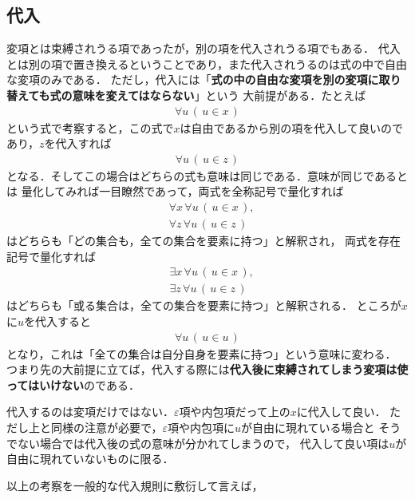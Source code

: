 \subsection{代入}
	変項とは束縛されうる項であったが，別の項を代入されうる項でもある．
	代入とは別の項で置き換えるということであり，また代入されうるのは式の中で自由な変項のみである．
	ただし，代入には「{\bf 式の中の自由な変項を別の変項に取り替えても式の意味を変えてはならない}」という
	大前提がある．たとえば
	\begin{align}
		\forall u\, (\, u \in x\, )
	\end{align}
	という式で考察すると，この式で$x$は自由であるから別の項を代入して良いのであり，$z$を代入すれば
	\begin{align}
		\forall u\, (\, u \in z\, )
	\end{align}
	となる．そしてこの場合はどちらの式も意味は同じである．意味が同じであるとは
	量化してみれば一目瞭然であって，両式を全称記号で量化すれば
	\begin{align}
		&\forall x\, \forall u\, (\, u \in x\, ), \\
		&\forall z\, \forall u\, (\, u \in z\, )
	\end{align}
	はどちらも「どの集合も，全ての集合を要素に持つ」と解釈され，
	両式を存在記号で量化すれば
	\begin{align}
		&\exists x\, \forall u\, (\, u \in x\, ), \\
		&\exists z\, \forall u\, (\, u \in z\, )
	\end{align}
	はどちらも「或る集合は，全ての集合を要素に持つ」と解釈される．
	ところが$x$に$u$を代入すると
	\begin{align}
		\forall u\, (\, u \in u\, )
	\end{align}
	となり，これは「全ての集合は自分自身を要素に持つ」という意味に変わる．
	つまり先の大前提に立てば，代入する際には{\bf 代入後に束縛されてしまう変項は使ってはいけない}のである．
	
	代入するのは変項だけではない．$\varepsilon$項や内包項だって上の$x$に代入して良い．
	ただし上と同様の注意が必要で，$\varepsilon$項や内包項に$u$が自由に現れている場合と
	そうでない場合では代入後の式の意味が分かれてしまうので，
	代入して良い項は$u$が自由に現れていないものに限る．
	
	以上の考察を一般的な代入規則に敷衍して言えば，
	

